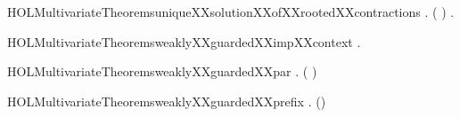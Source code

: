 \newcommand{\HOLMultivariateTheoremsuniqueXXsolutionXXofXXobsXXcontractionsXXlemma}{\UseVerbatim{HOLMultivariateTheoremsuniqueXXsolutionXXofXXobsXXcontractionsXXlemma}}
\begin{SaveVerbatim}{HOLMultivariateTheoremsuniqueXXsolutionXXofXXrootedXXcontractions}
\HOLTokenTurnstile{} \HOLSymConst{\HOLTokenForall{}} .
          \HOLSymConst{\HOLTokenConj{}}  ( )  \HOLSymConst{\HOLTokenImp{}}
       \HOLSymConst{\HOLTokenForall{}} .
            \HOLConst{\HOLTokenIn{}}     \HOLSymConst{\HOLTokenConj{}}
            \HOLConst{\HOLTokenIn{}}     \HOLSymConst{\HOLTokenImp{}}
             
\end{SaveVerbatim}
\newcommand{\HOLMultivariateTheoremsuniqueXXsolutionXXofXXrootedXXcontractions}{\UseVerbatim{HOLMultivariateTheoremsuniqueXXsolutionXXofXXrootedXXcontractions}}
\begin{SaveVerbatim}{HOLMultivariateTheoremsweaklyXXguardedXXimpXXcontext}
\HOLTokenTurnstile{} \HOLSymConst{\HOLTokenForall{}} .    \HOLSymConst{\HOLTokenImp{}}   
\end{SaveVerbatim}
\newcommand{\HOLMultivariateTheoremsweaklyXXguardedXXimpXXcontext}{\UseVerbatim{HOLMultivariateTheoremsweaklyXXguardedXXimpXXcontext}}
\begin{SaveVerbatim}{HOLMultivariateTheoremsweaklyXXguardedXXpar}
\HOLTokenTurnstile{} \HOLSymConst{\HOLTokenForall{}}  .
         ( \HOLSymConst{\ensuremath{\parallel}} ) \HOLSymConst{\HOLTokenImp{}}
          \HOLSymConst{\HOLTokenConj{}}   
\end{SaveVerbatim}
\newcommand{\HOLMultivariateTheoremsweaklyXXguardedXXpar}{\UseVerbatim{HOLMultivariateTheoremsweaklyXXguardedXXpar}}
\begin{SaveVerbatim}{HOLMultivariateTheoremsweaklyXXguardedXXprefix}
\HOLTokenTurnstile{} \HOLSymConst{\HOLTokenForall{}}  .   () \HOLSymConst{\HOLTokenImp{}}   
\end{SaveVerbatim}
